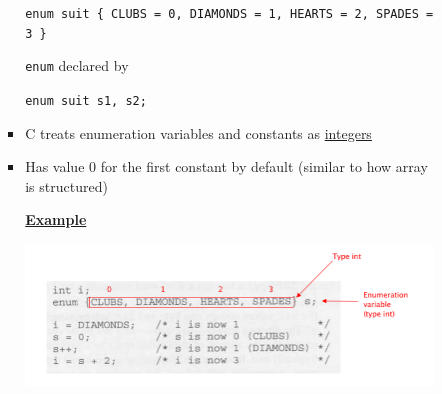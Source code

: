 \documentclass[12pt]{article}
\begin{document}
\begin{enumerate}[1.]
\begin{enumerate}[a)]
\begin{itemize}
\begin{itemize}
                \bigskip

                \texttt{enum suit \{ CLUBS = 0, DIAMONDS = 1, HEARTS = 2, SPADES = 3 \}}

                \bigskip

                \texttt{enum} declared by

                \bigskip

                \texttt{enum suit s1, s2;}

                \item C treats enumeration variables and constants as \underline{integers}
                \item Has value 0 for the first constant by default (similar to how array is structured)

                \bigskip

                \underline{\textbf{Example}}

                \begin{center}
                \includegraphics[width=\linewidth]{images/review_7_solution_12.png}
                \end{center}
            \end{itemize}
        \end{itemize}
    \end{enumerate}
\end{enumerate}
\end{document}
